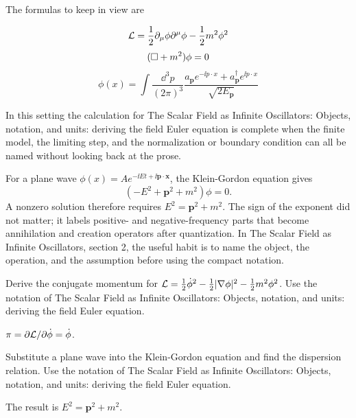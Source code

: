The formulas to keep in view are

\[
  \mathcal L=\frac12\partial_\mu\phi\partial^\mu\phi-\frac12m^2\phi^2
\]
\[
  (\Box+m^2)\phi=0
\]
\[
  \phi(x)=\int\frac{\dd^3p}{(2\pi)^3}\frac{a_{\bm p}e^{-\ii p\cdot x}+a_{\bm p}^\dagger e^{\ii p\cdot x}}{\sqrt{2E_{\bm p}}}
\]

In this setting the calculation for The Scalar Field as Infinite Oscillators: Objects, notation, and units: deriving the field Euler equation is complete when the finite model, the limiting step, and the normalization or boundary condition can all be named without looking back at the prose.




\begin{example}
For a plane wave \(\phi(x)=Ae^{-\ii Et+\ii\bm p\cdot\bm x}\), the Klein-Gordon equation gives
\[
  (-E^2+\bm p^2+m^2)\phi=0.
\]
A nonzero solution therefore requires \(E^2=\bm p^2+m^2\).  The sign of the exponent did not matter; it labels positive- and negative-frequency parts that become annihilation and creation operators after quantization.  In The Scalar Field as Infinite Oscillators, section 2, the useful habit is to name the object, the operation, and the assumption before using the compact notation.
\end{example}



\begin{exercise}
Derive the conjugate momentum for \(\mathcal L=\frac12\dot\phi^2-\frac12|\nabla\phi|^2-\frac12m^2\phi^2\).  Use the notation of The Scalar Field as Infinite Oscillators: Objects, notation, and units: deriving the field Euler equation.
\begin{answer}
\(\pi=\partial\mathcal L/\partial\dot\phi=\dot\phi\).
\end{answer}
\end{exercise}

\begin{exercise}
Substitute a plane wave into the Klein-Gordon equation and find the dispersion relation.  Use the notation of The Scalar Field as Infinite Oscillators: Objects, notation, and units: deriving the field Euler equation.
\begin{answer}
The result is \(E^2=\bm p^2+m^2\).
\end{answer}
\end{exercise}



